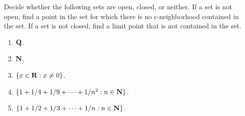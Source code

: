\documentclass{lew98_solutions}
\begin{document}
\begin{exercise}
\label{ex:3.2.3}
    Decide whether the following sets are open, closed, or neither. If a set is not open, find a point in the set for which there is no \( \epsilon \)-neighborhood contained in the set. If a set is not closed, find a limit point that is not contained in the set.
    \begin{enumerate}
        \item \( \mathbf{Q} \).

        \item \( \mathbf{N} \).

        \item \( \{ x \in \mathbf{R} : x \neq 0 \} \).

        \item \( \{ 1 + 1/4 + 1/9 + \cdots + 1/n^2 : n \in \mathbf{N} \} \).

        \item \( \{ 1 + 1/2 + 1/3 + \cdots + 1/n : n \in \mathbf{N} \} \).
    \end{enumerate}
\end{exercise}
\end{document}
